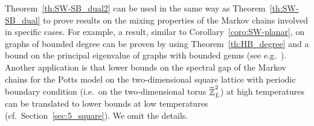 \documentclass{dis}
\theoremstyle{citing}
\begin{document}
Theorem~\ref{th:SW-SB_dual2} can be used in the same way 
as Theorem~\ref{th:SW-SB_dual} to prove results 
on the mixing properties of the Markov chains involved 
in specific cases. 
For example, a result, similar to Corollary~\ref{coro:SW-planar}, 
on graphs of bounded degree 
can be proven by using Theorem~\ref{th:HB_degree} and 
a bound on the principal eigenvalue of graphs with bounded 
genus (see e.g.~\cite{Dvorak-Mohar}).
Another application is that lower bounds on the spectral gap 
of the Markov chains for the Potts model 
on the two-dimensional square lattice with periodic boundary 
condition (i.e.~on the two-dimensional torus ${\raisebox{2pt}{ ${\widetilde{{}}}$ }\mkern-12mu {\ensuremath{\mathbb{Z}}}}_L^2$) 
at high temperatures 
can be translated to lower bounds at low temperatures 
(cf.~Section~\ref{sec:5_square}).
We omit the details.

  
  
  
  
  
  
  
  
  
  
  
  
  
  
  
  
  
  
  
  
  
  
  
  
  
  
  
  
  
  
  
  
  
  
  
  
  
  
  
  
  
  
  
  
  
  
  
  
  
  
  
  
  
  
  
  
  

\newpage
\thispagestyle{plain}
\end{document}

